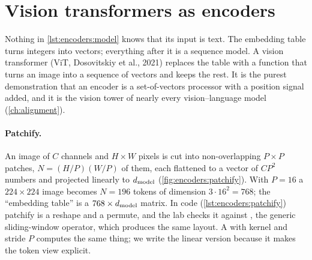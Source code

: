 \section{Vision transformers as encoders}\label{sec:encoders:vit}

Nothing in \cref{lst:encoders:model} knows that its input is text. The embedding table turns integers
into vectors; everything after it is a sequence model. A vision transformer (ViT, Dosovitskiy et al.,
2021) replaces the table with a function that turns an image into a sequence of vectors and keeps
the rest. It is the purest demonstration that an encoder is a set-of-vectors processor with a
position signal added, and it is the vision tower of nearly every vision--language model
(\cref{ch:alignment}).

\paragraph{Patchify.} An image of $C$ channels and $H\times W$ pixels is cut into non-overlapping
$P\times P$ patches, $N=(H/P)(W/P)$ of them, each flattened to a vector of $CP^2$ numbers and
projected linearly to $d_{\text{model}}$ (\cref{fig:encoders:patchify}). With $P=16$ a $224\times224$ image
becomes $N=196$ tokens of dimension $3\cdot16^2=768$; the ``embedding table'' is a $768\times d_{\text{model}}$
matrix. In code (\cref{lst:encoders:patchify}) patchify is a reshape and a permute, and the lab
checks it against , the generic sliding-window operator, which produces the same
layout. A  with kernel and stride $P$ computes the same thing; we write the linear
version because it makes the token view explicit.

